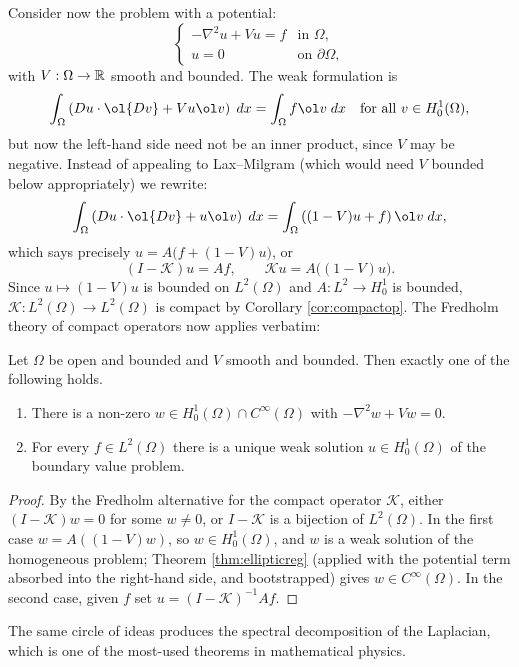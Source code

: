 \documentclass[a4paper]{scrartcl}
\begin{document}
Consider now the problem with a potential:
$$\begin{cases} -\nabla^2u+Vu = f & \text{in }\Omega, \\ u = 0 & \text{on }\partial\Omega,\end{cases}$$
with $V : \Omega \to \mathbb{R}$ smooth and bounded. The weak formulation is
$$\int_\Omega \left( Du\cdot\ol{Dv}+V u\ol v\right)\dd x = \int_\Omega f \ol v \dd x \quad \text{for all } v \in H_0^1(\Omega),$$
but now the left-hand side need not be an inner product, since $V$ may be negative. Instead of appealing to Lax--Milgram (which would need $V$ bounded below appropriately) we rewrite:
$$\int_\Omega\left(Du\cdot\ol{Dv}+u\ol v\right)\dd x = \int_\Omega\left((1-V)u+f\right)\ol v\dd x,$$
which says precisely $u = A\big(f+(1-V)u\big)$, or
$$(I - \mathcal{K})u = Af, \qquad \mathcal{K}u = A\big((1-V)u\big).$$
Since $u \mapsto (1-V)u$ is bounded on $L^2(\Omega)$ and $A : L^2 \to H_0^1$ is bounded, $\mathcal{K} : L^2(\Omega)\to L^2(\Omega)$ is compact by Corollary \ref{cor:compactop}. The Fredholm theory of compact operators now applies verbatim:

\begin{theorem}\label{thm:fredholm}
	Let $\Omega$ be open and bounded and $V$ smooth and bounded. Then exactly one of the following holds.
	\begin{enumerate}[label=(\roman*)]
		\item There is a non-zero $w \in H_0^1(\Omega)\cap C^\infty(\Omega)$ with $-\nabla^2w+Vw=0$.
		\item For every $f \in L^2(\Omega)$ there is a unique weak solution $u \in H_0^1(\Omega)$ of the boundary value problem.
	\end{enumerate}
\end{theorem}

\begin{proof}
	By the Fredholm alternative for the compact operator $\mathcal{K}$, either $(I-\mathcal{K})w=0$ for some $w \ne 0$, or $I - \mathcal{K}$ is a bijection of $L^2(\Omega)$. In the first case $w = A((1-V)w)$, so $w \in H_0^1(\Omega)$, and $w$ is a weak solution of the homogeneous problem; Theorem \ref{thm:ellipticreg} (applied with the potential term absorbed into the right-hand side, and bootstrapped) gives $w \in C^\infty(\Omega)$. In the second case, given $f$ set $u = (I-\mathcal{K})^{-1}Af$.
\end{proof}

The same circle of ideas produces the spectral decomposition of the Laplacian, which is one of the most-used theorems in mathematical physics.
\end{document}
